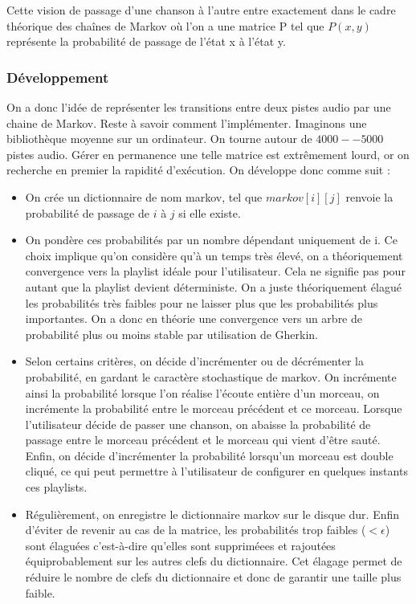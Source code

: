 \documentclass{report}
\begin{document}
Cette vision de passage d'une chanson à l'autre entre exactement dans le cadre théorique des chaînes de Markov où l'on a une matrice P tel que $P(x,y)$ représente la probabilité de passage de l'état x à l'état y.

\subsubsection{Développement}

On a donc l'idée de représenter les transitions entre deux pistes audio par une chaine de Markov. Reste à savoir comment l'implémenter. Imaginons une bibliothèque moyenne sur un ordinateur. On tourne autour de $4000 -- 5000$ pistes audio. Gérer en permanence une telle matrice est extrêmement lourd, or on recherche en premier la rapidité d'exécution. On développe donc comme suit :

\begin{itemize}
\item
On crée un dictionnaire de nom markov, tel que $markov[i][j]$ renvoie la probabilité de passage de $i$ à $j$ si elle existe.
\item
On pondère ces probabilités par un nombre dépendant uniquement de i. Ce choix implique qu'on considère qu'à un temps très élevé, on a théoriquement convergence vers la playlist idéale pour l'utilisateur. Cela ne signifie pas pour autant que la playlist devient déterministe. On a juste théoriquement élagué les probabilités très faibles pour ne laisser plus que les probabilités plus importantes. On a donc en théorie une convergence vers un arbre de probabilité plus ou
moins stable par utilisation de Gherkin.
\item
Selon certains critères, on décide d'incrémenter ou de décrémenter la probabilité, en gardant le caractère stochastique de markov. On incrémente ainsi la probabilité lorsque l'on réalise l'écoute entière d'un morceau, on incrémente la probabilité entre le morceau précédent et ce morceau. Lorsque l'utilisateur décide de passer une chanson, on abaisse la probabilité de passage entre le morceau précédent et le morceau qui vient d'être sauté. Enfin, on décide
d'incrémenter la probabilité lorsqu'un morceau est double cliqué, ce qui peut permettre à l'utilisateur de configurer en quelques instants ces playlists.
\item
Régulièrement, on enregistre le dictionnaire markov sur le disque dur. Enfin d'éviter de revenir au cas de la matrice, les probabilités trop faibles ($ < \epsilon$) sont élaguées c'est-à-dire qu'elles sont suppriméees et rajoutées équiprobablement sur les autres clefs du dictionnaire. Cet élagage permet de réduire le nombre de clefs du dictionnaire et donc de garantir une taille plus faible.
\end{itemize}
\end{document}

